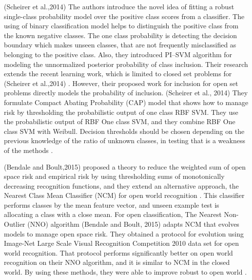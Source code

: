 \documentclass[conference]{IEEEtran}
\begin{document}
\par (Scheirer et al.,2014) \cite{jain2014multi} The authors introduce the novel idea of fitting a robust single-class probability model over the positive class scores from a classifier. The using of binary classification model helps to distinguish the positive class from the known negative classes. The one class probability is detecting the decision boundary which makes unseen classes, that are not frequently misclassified as belonging to the positive class. Also, they introduced PI–SVM algorithm for modeling the unnormalized posterior probability of class inclusion. Their research extends the recent learning work, which is limited to closed set problems for (Scheirer et al.,2014)\cite{scheirer2011meta} \cite{scheirer2012multi}. However, their proposed work for inclusion for open set problems directly models the probability of inclusion. (Scheirer et al., 2014) They formulate Compact Abating Probability (CAP) model that shows how to manage risk by thresholding the probabilistic output of one class RBF SVM. They use the probabilistic output of RBF One class SVM, and they combine RBF One class SVM with Weibull. Decision thresholds should be chosen depending on the previous knowledge of the ratio of unknown classes, in testing that is a weakness of the methods \cite{jain2014multi} . 





\par  (Bendale and Boult,2015) \cite{bendale2015towards} proposed a theory to reduce the weighted sum of open space risk and empirical risk by using thresholding sums of monotonically decreasing recognition functions, and they extend an alternative approach, the Nearest Class Mean Classifier (NCM) for open world recognition \cite{mensink2013distance}  \cite{ristin2014incremental}. This classifier performs classes by the mean feature vector, and unseen example test is allocating a class with a close mean. For open classification, The Nearest Non-Outlier (NNO) algorithm (Bendale and Boult, 2015) adapts NCM that evolves models to manage open space risk. They obtained a protocol for evolution using Image-Net Large Scale Visual Recognition Competition 2010 data set for open world recognition. That protocol performs significantly better on open world recognition on their NNO algorithm, and it is similar to NCM in the closed world. By using these methods, they were able to improve robust to open world  \cite{bendale2015towards}.
\end{document}
